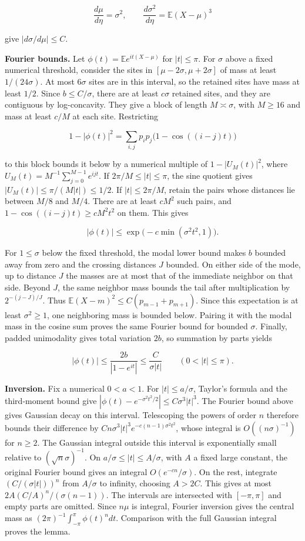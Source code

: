 \documentclass[11pt]{article}
\begin{document}
\[
\frac{d\mu}{d\eta}=\sigma^2,\qquad
\frac{d\sigma^2}{d\eta}=\mathbb E(X-\mu)^3
\]

give $|d\sigma/d\mu|\le C$.

\textbf{Fourier bounds.} Let $\phi(t)=\mathbb E e^{it(X-\mu)}$ for $|t|\le\pi$. For $\sigma$ above a fixed numerical threshold, consider the sites in $[\mu-2\sigma,\mu+2\sigma]$ of mass at least $1/(24\sigma)$. At most $6\sigma$ sites are in this interval, so the retained sites have mass at least $1/2$. Since $b\le C/\sigma$, there are at least $c\sigma$ retained sites, and they are contiguous by log-concavity. They give a block of length $M\asymp\sigma$, with $M\ge16$ and mass at least $c/M$ at each site. Restricting

\[
1-|\phi(t)|^2=\sum_{i,j}p_ip_j\bigl(1-\cos((i-j)t)\bigr)
\]

to this block bounds it below by a numerical multiple of $1-|U_M(t)|^2$, where $U_M(t)=M^{-1}\sum_{j=0}^{M-1}e^{ijt}$. If $2\pi/M\le|t|\le\pi$, the sine quotient gives $|U_M(t)|\le\pi/(M|t|)\le1/2$. If $|t|\le2\pi/M$, retain the pairs whose distances lie between $M/8$ and $M/4$. There are at least $cM^2$ such pairs, and $1-\cos((i-j)t)\ge cM^2t^2$ on them. This gives

\[
|\phi(t)|\le \exp\bigl(-c\min(\sigma^2t^2,1)\bigr).
\]

For $1\le\sigma$ below the fixed threshold, the modal lower bound makes $b$ bounded away from zero and the crossing distances $J$ bounded. On either side of the mode, up to distance $J$ the masses are at most that of the immediate neighbor on that side. Beyond $J$, the same neighbor mass bounds the tail after multiplication by $2^{-(j-J)/J}$. Thus $\mathbb E(X-m)^2\le C(p_{m-1}+p_{m+1})$. Since this expectation is at least $\sigma^2\ge1$, one neighboring mass is bounded below. Pairing it with the modal mass in the cosine sum proves the same Fourier bound for bounded $\sigma$. Finally, padded unimodality gives total variation $2b$, so summation by parts yields

\[
|\phi(t)|\le \frac{2b}{|1-e^{it}|}\le\frac{C}{\sigma|t|}
\qquad(0<|t|\le\pi).
\]

\textbf{Inversion.} Fix a numerical $0<a<1$. For $|t|\le a/\sigma$, Taylor's formula and the third-moment bound give $|\phi(t)-e^{-\sigma^2t^2/2}|\le C\sigma^3|t|^3$. The Fourier bound above gives Gaussian decay on this interval. Telescoping the powers of order $n$ therefore bounds their difference by $C n\sigma^3|t|^3 e^{-c(n-1)\sigma^2t^2}$, whose integral is $O((n\sigma)^{-1})$ for $n\ge2$. The Gaussian integral outside this interval is exponentially small relative to $(\sqrt n \sigma)^{-1}$. On $a/\sigma\le |t|\le A/\sigma$, with $A$ a fixed large constant, the original Fourier bound gives an integral $O(e^{-cn}/\sigma)$. On the rest, integrate $(C/(\sigma |t|))^n$ from $A/\sigma$ to infinity, choosing $A>2C$. This gives at most $2A(C/A)^n/(\sigma(n-1))$. The intervals are intersected with $[-\pi,\pi]$ and empty parts are omitted. Since $n\mu$ is integral, Fourier inversion gives the central mass as $(2\pi)^{-1}\int_{-\pi}^{\pi}\phi(t)^n dt$. Comparison with the full Gaussian integral proves the lemma.
\end{document}
